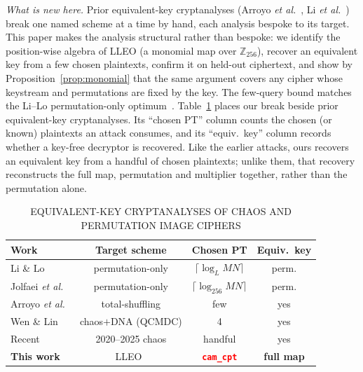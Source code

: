 \documentclass[conference,a4paper]{IEEEtran}
\newcommand{\PH}[1]{\textcolor{red}{\texttt{#1}}}
\begin{document}
\emph{What is new here.} Prior equivalent-key cryptanalyses (Arroyo \emph{et al.}~\cite{arroyo2009}, Li
\emph{et al.}~\cite{li2018entropy,li2019attacker}) break one named scheme at a time by hand, each analysis
bespoke to its target. This paper makes the analysis structural rather than bespoke: we identify the position-wise algebra of
LLEO (a monomial map over $\mathbb{Z}_{256}$), recover an equivalent key from a few chosen plaintexts,
confirm it on held-out ciphertext, and show by Proposition~\ref{prop:monomial} that the same argument
covers any cipher whose keystream and permutations are fixed by the key. The few-query bound matches the
Li--Lo permutation-only optimum~\cite{li2011optimal}.
Table~\ref{tab:compare} places our break beside prior equivalent-key cryptanalyses. Its ``chosen PT''
column counts the chosen (or known) plaintexts an attack consumes, and its ``equiv.\ key'' column records
whether a key-free decryptor is recovered. Like the earlier attacks, ours recovers an equivalent key from
a handful of chosen plaintexts; unlike them, that recovery reconstructs the full map, permutation and
multiplier together, rather than the permutation alone.

\begin{table}[t]
\centering
\caption{EQUIVALENT-KEY CRYPTANALYSES OF CHAOS AND PERMUTATION IMAGE CIPHERS}
\label{tab:compare}
\setlength{\tabcolsep}{3pt}
\begin{tabular}{|l|c|c|c|}
\hline
\textbf{Work} & \textbf{Target scheme} & \textbf{Chosen PT} & \textbf{Equiv.\ key} \\
\hline
Li \& Lo~\cite{li2011optimal}            & permutation-only      & $\lceil\log_{L} MN\rceil$   & perm. \\
\hline
Jolfaei \emph{et al.}~\cite{Jolfaei2016permutation} & permutation-only & $\lceil\log_{256} MN\rceil$ & perm. \\
\hline
Arroyo \emph{et al.}~\cite{arroyo2009}   & total-shuffling       & few                         & yes \\
\hline
Wen \& Lin~\cite{wenlin2024qcmdc}        & chaos${+}$DNA (QCMDC) & 4                           & yes \\
\hline
Recent~\cite{Ma2020cryptanalysis,Zhao2025cryptanalysis} & 2020--2025 chaos & handful          & yes \\
\hline
\textbf{This work} & LLEO~\cite{jain2025lleo} & \textbf{\PH{cam_cpt}} & \textbf{full map} \\
\hline
\end{tabular}
\end{table}
\end{document}
